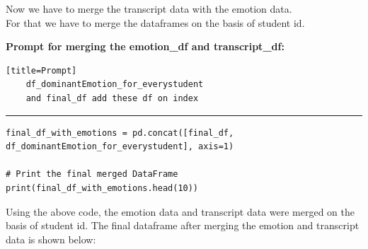 \documentclass[11pt,a4paper]{article}
\begin{document}
\begin{tcolorbox}[colback=yellow!10!white, colframe=red!80!black, title=Note]
  Now we have to merge the transcript data with the emotion data. \\
  For that we have to merge the dataframes on the basis of student id.
\end{tcolorbox}

\textbf{Prompt for merging the emotion\_df and transcript\_df:}
\begin{verbatim}[title=Prompt]
    df_dominantEmotion_for_everystudent
    and final_df add these df on index
\end{verbatim}
\begin{center}
    \color{red}\rule{1\linewidth}{0.5mm}
\end{center}

\begin{tcolorbox}
\begin{lstlisting}
final_df_with_emotions = pd.concat([final_df, df_dominantEmotion_for_everystudent], axis=1)

# Print the final merged DataFrame
print(final_df_with_emotions.head(10))

\end{lstlisting}
\end{tcolorbox}

\large{Using the above code, the emotion data and transcript data were merged on the basis of student id.}
\large{The final dataframe after merging the emotion and transcript data is shown below:}
\end{document}
